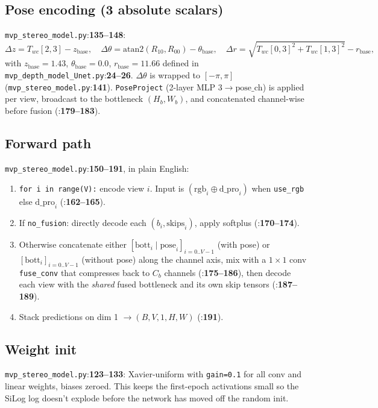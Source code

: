 \documentclass[11pt]{article}
\newcommand{\fref}[2]{\texttt{\textcolor{filegray}{#1}}:\textbf{#2}}
\begin{document}
\subsection{Pose encoding (3 absolute scalars)}
\fref{mvp\_stereo\_model.py}{135--148}:
\[
  \Delta z = T_{wc}[2,3] - z_{\text{base}},\quad
  \Delta\theta = \mathrm{atan2}(R_{10}, R_{00}) - \theta_{\text{base}},\quad
  \Delta r = \sqrt{T_{wc}[0,3]^2 + T_{wc}[1,3]^2} - r_{\text{base}},
\]
with $z_{\text{base}}=1.43$, $\theta_{\text{base}}=0.0$,
$r_{\text{base}}=11.66$ defined in
\fref{mvp\_depth\_model\_Unet.py}{24--26}. $\Delta\theta$ is wrapped to
$[-\pi,\pi]$
(\fref{mvp\_stereo\_model.py}{141}). \texttt{PoseProject} (2-layer MLP
$3\to\text{pose\_ch}$) is applied per view, broadcast to the bottleneck
$(H_b,W_b)$, and concatenated channel-wise before fusion
(\fref{}{179--183}).

\subsection{Forward path}
\fref{mvp\_stereo\_model.py}{150--191}, in plain English:

\begin{enumerate}[leftmargin=2em]
  \item \texttt{for i in range(V):} encode view $i$. Input is
        $(\text{rgb}_i \oplus \text{d\_pro}_i)$ when \texttt{use\_rgb} else
        $\text{d\_pro}_i$
        (\fref{}{162--165}).
  \item If \texttt{no\_fusion}: directly decode each $(b_i,
        \text{skips}_i)$, apply softplus
        (\fref{}{170--174}).
  \item Otherwise concatenate either
        $[\text{bott}_i \mid \text{pose}_i]_{i=0..V-1}$ (with pose) or
        $[\text{bott}_i]_{i=0..V-1}$ (without pose) along the channel
        axis, mix with a $1{\times}1$ conv \texttt{fuse\_conv} that
        compresses back to $C_b$ channels
        (\fref{}{175--186}), then decode each view with the
        \emph{shared} fused bottleneck and its own skip tensors
        (\fref{}{187--189}).
  \item Stack predictions on dim 1 $\to (B,V,1,H,W)$
        (\fref{}{191}).
\end{enumerate}

\subsection{Weight init}
\fref{mvp\_stereo\_model.py}{123--133}: Xavier-uniform with \texttt{gain=0.1}
for all conv and linear weights, biases zeroed. This keeps the first-epoch
activations small so the SiLog log doesn't explode before the network has
moved off the random init.
\end{document}
